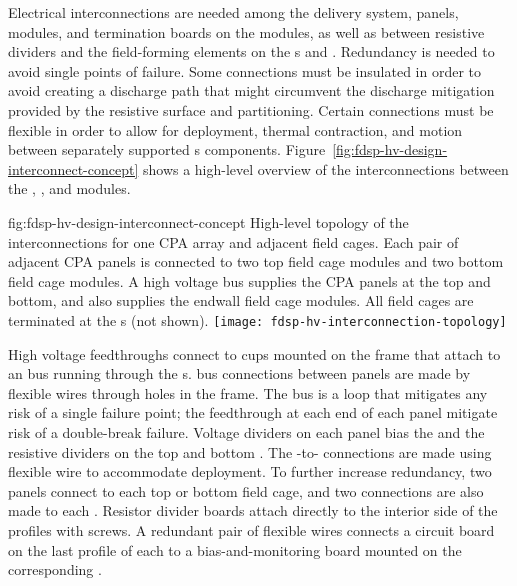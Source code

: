 Electrical interconnections are needed among the  delivery system,  panels,  modules, and termination
boards on the  modules, as well as between resistive dividers and
the field-forming elements on the s and .  
Redundancy is
needed to avoid single points of failure. 
Some connections must be
insulated in order to avoid creating a discharge path that might
circumvent the discharge mitigation provided by the resistive 
surface and  partitioning.  Certain connections must be
flexible in order to allow for  deployment, thermal
contraction, and motion between separately supported s components.  Figure~\ref{fig:fdsp-hv-design-interconnect-concept} shows a high-level
overview of the interconnections between the , , and  modules.

\begin{dunefigure}{fig:fdsp-hv-design-interconnect-concept}
  {High-level topology of the  interconnections for one CPA array and adjacent field cages. Each pair of adjacent CPA panels is connected to two top field cage modules and two bottom field cage modules. A high voltage bus supplies the CPA panels at the top and bottom, and also supplies the endwall field cage modules. All field cages are terminated at the s (not shown).}
  \texttt{[image: fdsp-hv-interconnection-topology]}
\end{dunefigure}

High voltage feedthroughs connect to cups mounted on the  frame
that attach to an  bus running through the s.   bus connections
between  panels are made by flexible wires through holes in the
 frame. The  bus is a loop that mitigates any risk of a single
failure point; the feedthrough at each end of each  panel mitigate
risk of a double-break failure.  Voltage dividers on each  panel
bias the  and the resistive dividers on the top
and bottom .  The -to- connections are made using
flexible wire to accommodate  deployment.  To further
increase redundancy, two  panels connect to each top or bottom
field cage, and two connections are also made to each . Resistor divider boards attach directly to the interior side of
the  profiles with screws.   A redundant pair of flexible wires
connects a circuit board on the last profile of each  to a
bias-and-monitoring board mounted on the corresponding .

